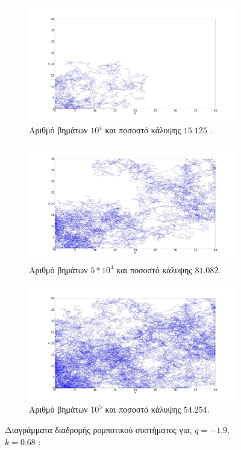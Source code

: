 \begin{figure}[ht]
	\centering
	\begin{subfigure}[b]{0.75\textwidth}
		\centering
		\includegraphics[width=\textwidth]{LateX images/log/steps/g1-1.9}
		\caption{Αριθμό βημάτων $10^4$ και ποσοστό κάλυψης $15.125$ .}
		\label{f:g113}
	\end{subfigure}
	\hfill
	\begin{subfigure}[b]{0.75\textwidth}
		\centering
		\includegraphics[width=\textwidth]{LateX images/log/steps/g2-1.9}
		\caption{Αριθμό βημάτων $5*10^4$ και ποσοστό κάλυψης $81.082$.}
		\label{f:g114}
	\end{subfigure}
	\hfill
	\begin{subfigure}[b]{0.75\textwidth}
		\centering
		\includegraphics[width=\textwidth]{LateX images/log/steps/g4-1.9}
		\caption{Αριθμό βημάτων $10^5$ και ποσοστό κάλυψης $54.254$.}
		\label{f:g115}
	\end{subfigure}
	\hfill
	\caption{Διαγράμματα διαδρομής ρομποτικού συστήματος για, $q = -1.9$, $k = 0.68$ :}
\end{figure}
\clearpage

